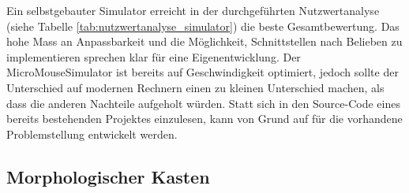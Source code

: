 Ein selbstgebauter Simulator erreicht in der durchgeführten Nutzwertanalyse (siehe Tabelle \ref{tab:nutzwertanalyse_simulator}) die beste Gesamtbewertung. Das hohe Mass an Anpassbarkeit und die Möglichkeit, Schnittstellen nach Belieben zu implementieren sprechen klar für eine Eigenentwicklung. Der MicroMouseSimulator ist bereits auf Geschwindigkeit optimiert, jedoch sollte der Unterschied auf modernen Rechnern einen zu kleinen Unterschied machen, als dass die anderen Nachteile aufgeholt würden. Statt sich in den Source-Code eines bereits bestehenden Projektes einzulesen, kann von Grund auf für die vorhandene Problemstellung entwickelt werden.




\subsection{Morphologischer Kasten}

